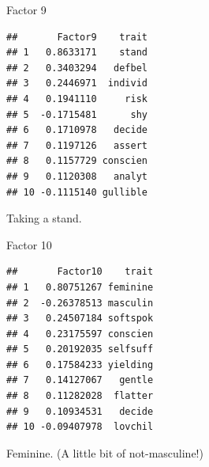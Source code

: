 \documentclass[ignorenonframetext,]{beamer}
\newenvironment{Shaded}{\begin{snugshade}}{\end{snugshade}}
\newcommand{\DecValTok}[1]{\textcolor[rgb]{0.00,0.00,0.81}{#1}}
\newcommand{\KeywordTok}[1]{\textcolor[rgb]{0.13,0.29,0.53}{\textbf{#1}}}
\newcommand{\NormalTok}[1]{#1}
\newcommand{\OperatorTok}[1]{\textcolor[rgb]{0.81,0.36,0.00}{\textbf{#1}}}
\newcommand{\StringTok}[1]{\textcolor[rgb]{0.31,0.60,0.02}{#1}}
\begin{document}
\begin{frame}[fragile]{Factor 9}
\protect\hypertarget{factor-9}{}

\footnotesize

\begin{Shaded}
\end{Shaded}

\begin{verbatim}
##       Factor9    trait
## 1   0.8633171    stand
## 2   0.3403294   defbel
## 3   0.2446971  individ
## 4   0.1941110     risk
## 5  -0.1715481      shy
## 6   0.1710978   decide
## 7   0.1197126   assert
## 8   0.1157729 conscien
## 9   0.1120308   analyt
## 10 -0.1115140 gullible
\end{verbatim}

\normalsize

Taking a stand.

\end{frame}

\begin{frame}[fragile]{Factor 10}
\protect\hypertarget{factor-10}{}

\footnotesize

\begin{Shaded}
\end{Shaded}

\begin{verbatim}
##       Factor10    trait
## 1   0.80751267 feminine
## 2  -0.26378513 masculin
## 3   0.24507184 softspok
## 4   0.23175597 conscien
## 5   0.20192035 selfsuff
## 6   0.17584233 yielding
## 7   0.14127067   gentle
## 8   0.11282028  flatter
## 9   0.10934531   decide
## 10 -0.09407978  lovchil
\end{verbatim}

\normalsize

Feminine. (A little bit of not-masculine!)

\end{frame}
\end{document}
